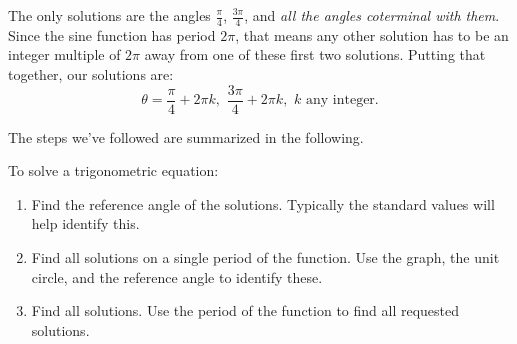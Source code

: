 \documentclass[nooutcomes]{ximera}
\begin{document}
\begin{image}
\end{image}

The only solutions are the angles $\frac{\pi}{4}$, $\frac{3\pi}{4}$, and \emph{all the angles coterminal with them}. Since the sine function has period
$2\pi$, that means any other solution has to be an integer multiple of $2\pi$ away from one of these first two solutions. Putting that together, our solutions
are:
$$ \theta = \frac{\pi}{4} + 2\pi k , \,\, \frac{3\pi}{4}+2\pi k , \,\, k \textrm{ any integer}. $$

The steps we've followed are summarized in the following.
\begin{callout}
	To solve a trigonometric equation:
	\begin{enumerate}
		\item Find the reference angle of the solutions. Typically the standard values will help identify this.
		\item Find all solutions on a single period of the function. Use the graph, the unit circle, and the reference angle to identify these.
		\item Find all solutions. Use the period of the function to find all requested solutions.
	\end{enumerate}
\end{callout}
\end{document}
